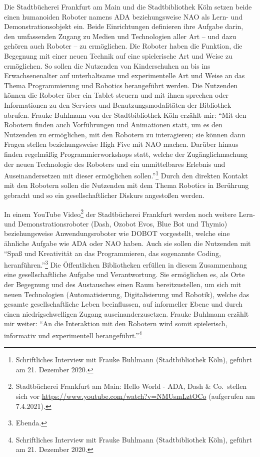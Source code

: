 \documentclass[a4paper,
fontsize=11pt,
oneside,
numbers=noperiodatend,
parskip=half-,
bibliography=totoc,
final
]{scrartcl}
\begin{document}
Die Stadtbücherei Frankfurt am Main und die Stadtbibliothek Köln setzen
beide einen humanoiden Roboter namens ADA beziehungsweise NAO als Lern-
und Demonstrationsobjekt ein. Beide Einrichtungen definieren ihre
Aufgabe darin, den umfassenden Zugang zu Medien und Technologien aller
Art -- und dazu gehören auch Roboter -- zu ermöglichen. Die Roboter
haben die Funktion, die Begegnung mit einer neuen Technik auf eine
spielerische Art und Weise zu ermöglichen. So sollen die Nutzenden von
Kinderschuhen an bis ins Erwachsenenalter auf unterhaltsame und
experimentelle Art und Weise an das Thema Programmierung und Robotics
herangeführt werden. Die Nutzenden können die Roboter über ein Tablet
steuern und mit ihnen sprechen oder Informationen zu den Services und
Benutzungsmodalitäten der Bibliothek abrufen. Frauke Buhlmann von der
Stadtbibliothek Köln erzählt mir: \enquote{Mit den Robotern finden auch
Vorführungen und Animationen statt, um es den Nutzenden zu ermöglichen,
mit den Robotern zu interagieren; sie können dann Fragen stellen
beziehungsweise High Five mit NAO machen. Darüber hinaus finden
regelmäßig Programmierworkshops statt, welche der Zugänglichmachung der
neuen Technologie des Roboters und ein unmittelbares Erlebnis und
Auseinandersetzen mit dieser ermöglichen sollen.}\footnote{Schriftliches
  Interview mit Frauke Buhlmann (Stadtbibliothek Köln), geführt am 21.
  Dezember 2020.} Durch den direkten Kontakt mit den Robotern sollen die
Nutzenden mit dem Thema Robotics in Berührung gebracht und so ein
gesellschaftlicher Diskurs angestoßen werden.

In einem YouTube Video\footnote{Stadtbücherei Frankfurt am Main: Hello
  World - ADA, Dash \& Co.~stellen sich vor
  \url{https://www.youtube.com/watch?v=NMUsmLztOCo} (aufgerufen am
  7.4.2021).} der Stadtbücherei Frankfurt werden noch weitere Lern- und
Demonstrationsroboter (Dash, Ozobot Evos, Blue Bot und Thymio)
beziehungsweise Anwendungsroboter wie DOBOT vorgestellt, welche eine
ähnliche Aufgabe wie ADA oder NAO haben. Auch sie sollen die Nutzenden
mit \enquote{Spaß und Kreativität an das Programmieren, das sogenannte
Coding, heranführen.}\footnote{Ebenda.} Die Öffentlichen Bibliotheken
erfüllen in diesem Zusammenhang eine gesellschaftliche Aufgabe und
Verantwortung. Sie ermöglichen es, als Orte der Begegnung und des
Austausches einen Raum bereitzustellen, um sich mit neuen Technologien
(Automatisierung, Digitalisierung und Robotik), welche das gesamte
gesellschaftliche Leben beeinflussen, auf informeller Ebene und durch
einen niedrigschwelligen Zugang auseinanderzusetzen. Frauke Buhlmann
erzählt mir weiter: \enquote{An die Interaktion mit den Robotern wird
somit spielerisch, informativ und experimentell
herangeführt.}\footnote{Schriftliches Interview mit Frauke Buhlmann
  (Stadtbibliothek Köln), geführt am 21. Dezember 2020.}
\end{document}
